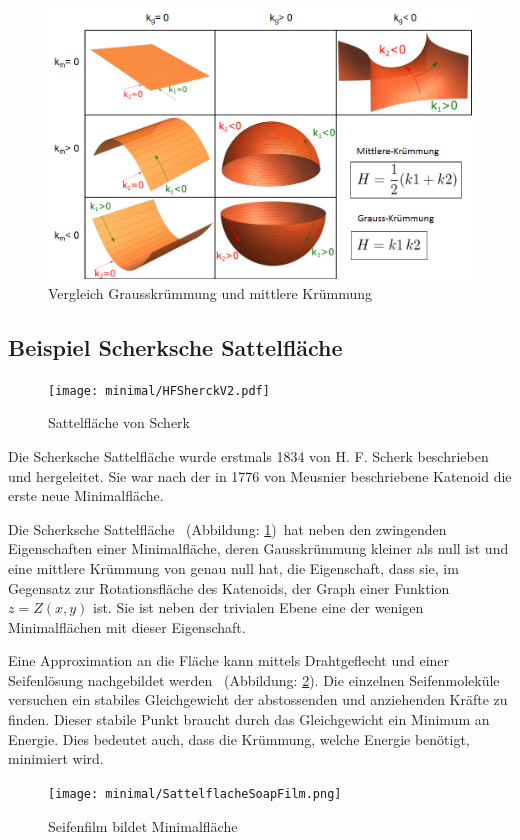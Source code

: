 \begin{refsection}
\begin{figure} 
  \centering
  \includegraphics[scale=0.5]{minimal/Tabelle_Kruemmung.png}
  \caption{Vergleich Grausskrümmung und mittlere Krümmung} 
\end{figure}




\subsection{Beispiel Scherksche Sattelfläche}
\label{minimal:ScherkSattel}
\begin{figure}
  \centering
  \texttt{[image: minimal/HFSherckV2.pdf]}
  \caption{Sattelfläche von Scherk} 
  \label{fig:Scherk}
\end{figure}
Die Scherksche Sattelfläche wurde erstmals 1834 von H. F. Scherk beschrieben \cite{minimal:JournalAM} und hergeleitet. Sie war nach der in 1776 von Meusnier beschriebene Katenoid die erste neue Minimalfläche. 

Die Scherksche Sattelfläche \, (Abbildung: \ref{fig:Scherk})\, hat neben den zwingenden Eigenschaften einer Minimalfläche, deren Gausskrümmung kleiner als null ist und eine mittlere Krümmung von genau null hat, die Eigenschaft, dass sie, im Gegensatz zur Rotationsfläche des Katenoids, der Graph einer Funktion $z=Z(x,y)$ ist. Sie ist neben der trivialen Ebene eine der wenigen Minimalflächen mit dieser Eigenschaft.

Eine Approximation an die Fläche kann mittels Drahtgeflecht und einer Seifenlösung nachgebildet werden \, (Abbildung: \ref{fig:SoapScherk}). Die einzelnen Seifenmoleküle versuchen ein stabiles Gleichgewicht der abstossenden und anziehenden Kräfte zu finden. Dieser stabile Punkt braucht durch das Gleichgewicht ein Minimum an Energie. Dies bedeutet auch, dass die Krümmung, welche Energie benötigt, minimiert wird.
\begin{figure}
  \centering
  \texttt{[image: minimal/SattelflacheSoapFilm.png]}
  \caption{Seifenfilm bildet Minimalfläche} 
  \label{fig:SoapScherk}
\end{figure}



\end{refsection}
